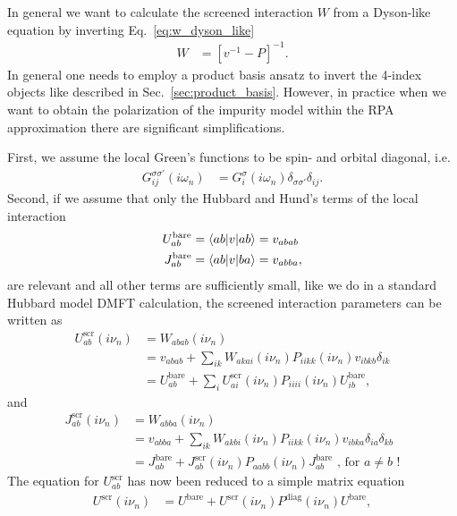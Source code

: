 \documentclass[12pt,a4paper]{scrartcl}
\numberwithin{equation}{section}
\begin{document}
In general we want to calculate the screened interaction $W$ from 
a Dyson-like equation by inverting Eq.~\ref{eq:w_dyson_like}
\begin{align}
 W &= [v^{-1} - P ]^{-1}.
\end{align}
In general one needs to employ a product basis ansatz
to invert the 4-index objects like described in Sec.~\ref{sec:product_basis}.
However, in practice when we want to obtain the polarization of the impurity
model within the RPA approximation there are significant simplifications.

First, we assume the local Green's functions to be spin- and orbital diagonal, i.e.
\begin{align}
 G^{\sigma\sigma'}_{ij}(i\omega_n)
 &= G^{\sigma}_{i}(i\omega_n)\delta_{\sigma\sigma'}\delta_{ij}.
\end{align}
Second, if we assume that only the Hubbard and Hund's terms of the local interaction
\begin{align}
 U^{\mathrm{bare}}_{ab} &= \braket{ab|v|ab} = v_{abab} \\
 J^{\mathrm{bare}}_{ab} &= \braket{ab|v|ba} = v_{abba} ,
\end{align}
are relevant and all other terms are sufficiently small, like 
we do in a standard Hubbard model DMFT calculation, the screened interaction parameters can be written as
\begin{align}
U^{\mathrm{scr}}_{ab}(i\nu_n) &= W_{abab}(i\nu_n) \\
%
&= v_{abab}  + \sum_{ i k }
                     W_{akai} (i\nu_n) P_{iikk}(i\nu_n)
                     v_{ibkb}\delta_{ik} \\
%
& = U^{\mathrm{bare}}_{ab}  + \sum_{i}
                     U^{\mathrm{scr}}_{ai} (i\nu_n) P_{iiii}(i\nu_n)
                     U^{\mathrm{bare}}_{ib} , 
\end{align}
and 
\begin{align}
J^{\mathrm{scr}}_{ab}(i\nu_n) &= W_{abba}(i\nu_n) \\
%
&= v_{abba}  + \sum_{ i k}
                     W_{akbi} (i\nu_n) P_{iikk}(i\nu_n)
                     v_{ibka}\delta_{ia}\delta_{kb} \\
%
& = J^{\mathrm{bare}}_{ab}  + 
                     J^{\mathrm{scr}}_{ab} (i\nu_n) P_{aabb}(i\nu_n)
                     J^{\mathrm{bare}}_{ab} \mbox{ , for } a\neq b \mbox{ !}
\end{align}
The equation for $U^{\mathrm{scr}}_{ab}$ has now been reduced to a simple matrix equation
\begin{align}
U^{\mathrm{scr}}(i\nu_n) 
& = U^{\mathrm{bare}}  + U^{\mathrm{scr}} (i\nu_n) P^{\mathrm{diag}}(i\nu_n) U^{\mathrm{bare}},
\end{align}
\end{document}
